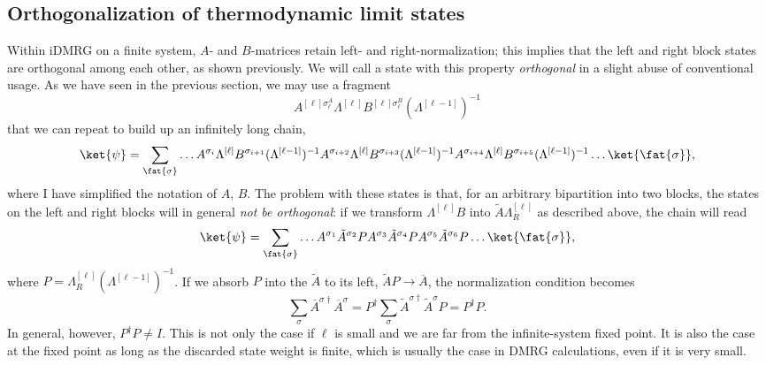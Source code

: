\subsection{Orthogonalization of thermodynamic limit states}

Within iDMRG on a finite system, $A$- and $B$-matrices retain left- and right-normalization; this implies that the left and right block states are orthogonal among each other, as shown previously. We will call a state with this property {\em orthogonal} in a slight abuse of conventional usage. As we have seen in the previous section, we may use a fragment 
\begin{equation}
A^{[\ell]\sigma_\ell^A}\Lambda^{[\ell]} B^{[\ell]\sigma_\ell^B} (\Lambda^{[\ell-1]})^{-1}
\end{equation}
that we can repeat to build up an infinitely long chain,
\begin{equation}
\ket{\psi} = \sum_{\fat{\sigma}} \ldots A^{\sigma_i}\Lambda^{[\ell]} B^{\sigma_{i+1}} (\Lambda^{[\ell-1]})^{-1}A^{\sigma_{i+2}}\Lambda^{[\ell]} B^{\sigma_{i+3}} (\Lambda^{[\ell-1]})^{-1}A^{\sigma_{i+4}}\Lambda^{[\ell]} B^{\sigma_{i+5}} (\Lambda^{[\ell-1]})^{-1} \ldots \ket{\fat{\sigma}} ,
\end{equation}
where I have simplified the notation of $A$, $B$. The problem with these states is that, for an arbitrary bipartition into two blocks, the states on the left and right blocks will in general {\em not be orthogonal}: if we transform $\Lambda^{[\ell]} B$ into $\tilde{A} \Lambda_R^{[\ell]}$ as described above, the chain will read
\begin{equation}
\ket{\psi} = \sum_{\fat{\sigma}} \ldots A^{\sigma_1}\tilde{A}^{\sigma_{2}} P
A^{\sigma_{3}} \tilde{A}^{\sigma_{4}} P A^{\sigma_{5}}\tilde{A}^{\sigma_{6}} P \ldots \ket{\fat{\sigma}} ,
\end{equation}
where $P= \Lambda_R^{[\ell]} (\Lambda^{[\ell-1]})^{-1}$. If we absorb $P$ into the $\tilde{A}$ to its left, $\tilde{A}P \rightarrow \overline{A}$, the normalization condition becomes
\begin{equation}
\sum_\sigma \overline{A}^{\sigma\dagger} \overline{A}^{\sigma} = P^\dagger \sum_\sigma \tilde{A}^{\sigma\dagger} \tilde{A}^\sigma P = P^\dagger P.
\end{equation}
In general, however, $P^\dagger P \neq I$. This is not only the case if $\ell$ is small and we are far from the infinite-system fixed point. It is also the case at the fixed point as long as the discarded state weight is finite, which is usually the case in DMRG calculations, even if it is very small.

